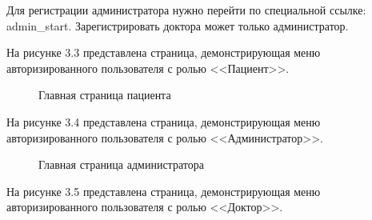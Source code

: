 Для регистрации администратора нужно перейти по специальной ссылке: admin\_start. Зарегистрировать доктора может только администратор.

На рисунке 3.3 представлена страница, демонстрирующая меню авторизированного пользователя с ролью <<Пациент>>.

\begin{figure}[!h]
	\caption{Главная страница пациента}
\end{figure}

На рисунке 3.4 представлена страница, демонстрирующая меню авторизированного пользователя с ролью <<Администратор>>.

\begin{figure}[!h]
	\caption{Главная страница администратора}
\end{figure}

\clearpage
На рисунке 3.5 представлена страница, демонстрирующая меню авторизированного пользователя с ролью <<Доктор>>.


